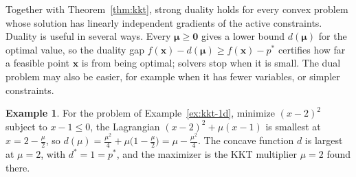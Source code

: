 \documentclass[11pt]{article}
\theoremstyle{definition}
\newtheorem{example}[definition]{Example}
\theoremstyle{plain}
\theoremstyle{remark}
\begin{document}
Together with Theorem~\ref{thm:kkt}, strong duality holds for every convex problem whose solution has linearly independent gradients of the active constraints. Duality is useful in several ways. Every $\boldsymbol{\mu} \geq \mathbf{0}$ gives a lower bound $d(\boldsymbol{\mu})$ for the optimal value, so the duality gap $f(\mathbf{x}) - d(\boldsymbol{\mu}) \geq f(\mathbf{x}) - p^*$ certifies how far a feasible point $\mathbf{x}$ is from being optimal; solvers stop when it is small. The dual problem may also be easier, for example when it has fewer variables, or simpler constraints.

\begin{example}\label{ex:dual-1d}
    For the problem of Example~\ref{ex:kkt-1d}, minimize $(x - 2)^2$ subject to $x - 1 \leq 0$, the Lagrangian $(x - 2)^2 + \mu(x - 1)$ is smallest at $x = 2 - \frac{\mu}{2}$, so $d(\mu) = \frac{\mu^2}{4} + \mu\big(1 - \frac{\mu}{2}\big) = \mu - \frac{\mu^2}{4}$. The concave function $d$ is largest at $\mu = 2$, with $d^* = 1 = p^*$, and the maximizer is the KKT multiplier $\mu = 2$ found there.
\end{example}
\end{document}
